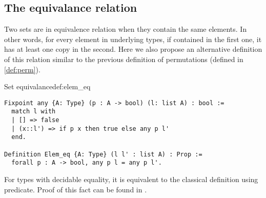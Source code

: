 \subsection{The equivalance relation}
Two sets are in equivalence relation when they contain the same elements. In other words, for every element in underlying types, if contained in the first one, it has at least one copy in the second. Here we also propose an alternative definition of this relation similar to the previous definition of permutations (defined in \ref{def:perm}).
\begin{defi}{Set equivalance}{def:elem_eq}
\begin{verbatim}
Fixpoint any {A: Type} (p : A -> bool) (l: list A) : bool :=
  match l with
  | [] => false
  | (x::l') => if p x then true else any p l'
  end.

Definition Elem_eq {A: Type} (l l' : list A) : Prop := 
  forall p : A -> bool, any p l = any p l'.
\end{verbatim}
\end{defi}
For types with decidable equality, it is equivalent to the classical definition using  predicate. Proof of this fact can be found in .
